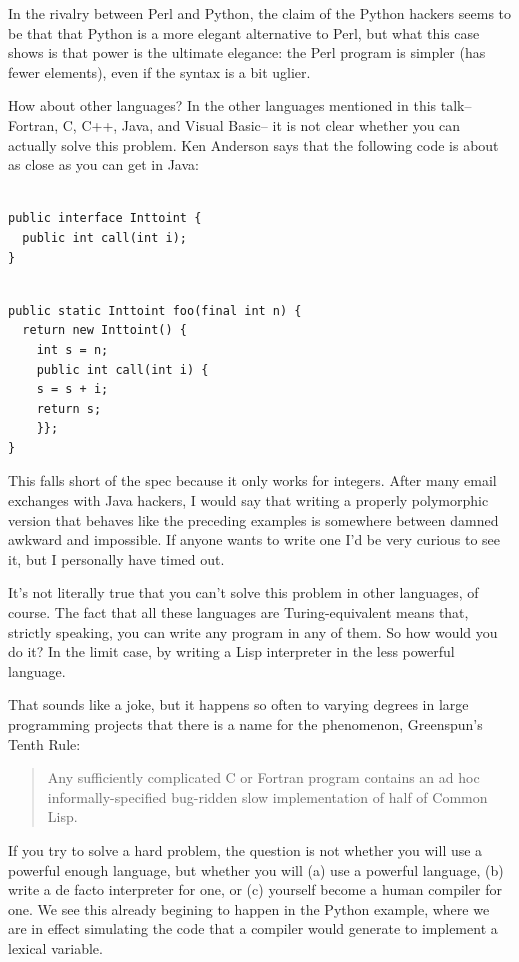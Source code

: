 In the rivalry between Perl and Python, the claim of the Python hackers
seems to be that that Python is a more elegant alternative to Perl, but
what this case shows is that power is the ultimate elegance: the Perl
program is simpler (has fewer elements), even if the syntax is a bit
uglier.

How about other languages? In the other languages mentioned in this
talk-- Fortran, C, C++, Java, and Visual Basic-- it is not clear whether
you can actually solve this problem. Ken Anderson says that the
following code is about as close as you can get in Java:

\begin{verbatim}

public interface Inttoint {
  public int call(int i);
}
\end{verbatim}

\begin{verbatim}

public static Inttoint foo(final int n) {
  return new Inttoint() {
    int s = n;
    public int call(int i) {
    s = s + i;
    return s;
    }};
}
\end{verbatim}

This falls short of the spec because it only works for integers. After
many email exchanges with Java hackers, I would say that writing a
properly polymorphic version that behaves like the preceding examples is
somewhere between damned awkward and impossible. If anyone wants to
write one I'd be very curious to see it, but I personally have timed
out.

It's not literally true that you can't solve this problem in other
languages, of course. The fact that all these languages are
Turing-equivalent means that, strictly speaking, you can write any
program in any of them. So how would you do it? In the limit case, by
writing a Lisp interpreter in the less powerful language.

That sounds like a joke, but it happens so often to varying degrees in
large programming projects that there is a name for the phenomenon,
Greenspun's Tenth Rule:

\begin{quote}
Any sufficiently complicated C or Fortran program contains an ad hoc
informally-specified bug-ridden slow implementation of half of Common
Lisp.
\end{quote}

If you try to solve a hard problem, the question is not whether you will
use a powerful enough language, but whether you will (a) use a powerful
language, (b) write a de facto interpreter for one, or (c) yourself
become a human compiler for one. We see this already begining to happen
in the Python example, where we are in effect simulating the code that a
compiler would generate to implement a lexical variable.

